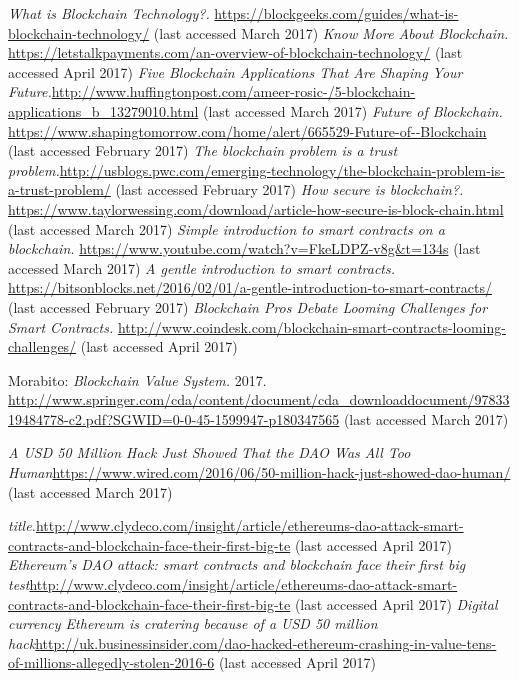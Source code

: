\begin{thebibliography}{99}
\emph{What is Blockchain Technology?.} \url{https://blockgeeks.com/guides/what-is-blockchain-technology/} (last accessed March 2017)
\emph{Know More About Blockchain.} \url{https://letstalkpayments.com/an-overview-of-blockchain-technology/} (last accessed April 2017)
\emph{Five Blockchain Applications That Are Shaping Your Future.}\url{http://www.huffingtonpost.com/ameer-rosic-/5-blockchain-applications_b_13279010.html} (last accessed March 2017)
\emph{Future of Blockchain.} \url{https://www.shapingtomorrow.com/home/alert/665529-Future-of--Blockchain} (last accessed February 2017)
\emph{The blockchain problem is a trust problem.}\url{http://usblogs.pwc.com/emerging-technology/the-blockchain-problem-is-a-trust-problem/} (last accessed February 2017)
\emph{How secure is blockchain?.} \url{https://www.taylorwessing.com/download/article-how-secure-is-block-chain.html} (last accessed March 2017)
\emph{Simple introduction to smart contracts on a blockchain.} \url{https://www.youtube.com/watch?v=FkeLDPZ-v8g&t=134s} (last accessed March 2017)
\emph{A gentle introduction to smart contracts.} \url{https://bitsonblocks.net/2016/02/01/a-gentle-introduction-to-smart-contracts/} (last accessed February 2017)
\emph{Blockchain Pros Debate Looming Challenges for Smart Contracts.} \url{http://www.coindesk.com/blockchain-smart-contracts-looming-challenges/} (last accessed April 2017)



Morabito: \emph{Blockchain Value System.} 2017. \url{http://www.springer.com/cda/content/document/cda_downloaddocument/9783319484778-c2.pdf?SGWID=0-0-45-1599947-p180347565} (last accessed March 2017)



\emph{A USD 50 Million Hack Just Showed That the DAO Was All Too Human}\url{https://www.wired.com/2016/06/50-million-hack-just-showed-dao-human/} (last accessed March 2017)

\emph{title.}\url{http://www.clydeco.com/insight/article/ethereums-dao-attack-smart-contracts-and-blockchain-face-their-first-big-te} (last accessed April 2017)
\emph{Ethereum's DAO attack: smart contracts and blockchain face their first big test}\url{http://www.clydeco.com/insight/article/ethereums-dao-attack-smart-contracts-and-blockchain-face-their-first-big-te} (last accessed April 2017)
\emph{Digital currency Ethereum is cratering because of a USD 50 million hack}\url{http://uk.businessinsider.com/dao-hacked-ethereum-crashing-in-value-tens-of-millions-allegedly-stolen-2016-6} (last accessed April 2017)



\end{thebibliography}
